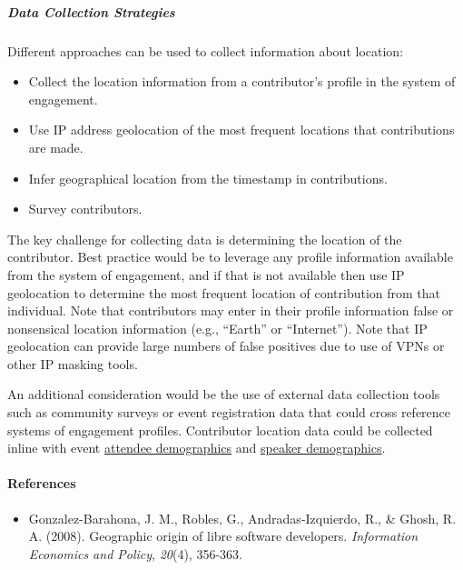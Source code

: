 \hypertarget{data-collection-strategies}{%
\subparagraph{Data Collection
Strategies}\label{data-collection-strategies}}

Different approaches can be used to collect information about location:

\begin{itemize}
\tightlist
\item
  Collect the location information from a contributor's profile in the
  system of engagement.
\item
  Use IP address geolocation of the most frequent locations that
  contributions are made.
\item
  Infer geographical location from the timestamp in contributions.
\item
  Survey contributors.
\end{itemize}

The key challenge for collecting data is determining the location of the
contributor. Best practice would be to leverage any profile information
available from the system of engagement, and if that is not available
then use IP geolocation to determine the most frequent location of
contribution from that individual. Note that contributors may enter in
their profile information false or nonsensical location information
(e.g., ``Earth'' or ``Internet''). Note that IP geolocation can provide
large numbers of false positives due to use of VPNs or other IP masking
tools.

An additional consideration would be the use of external data collection
tools such as community surveys or event registration data that could
cross reference systems of engagement profiles. Contributor location
data could be collected inline with event
\href{https://chaoss.community/metric-attendee-demographics/}{attendee
demographics} and
\href{https://chaoss.community/metric-speaker-demographics/}{speaker
demographics}.

\hypertarget{references}{%
\paragraph{References}\label{references}}

\begin{itemize}
\tightlist
\item
  Gonzalez-Barahona, J. M., Robles, G., Andradas-Izquierdo, R., \&
  Ghosh, R. A. (2008). Geographic origin of libre software developers.
  \emph{Information Economics and Policy}, \emph{20}(4), 356-363.
\end{itemize}
